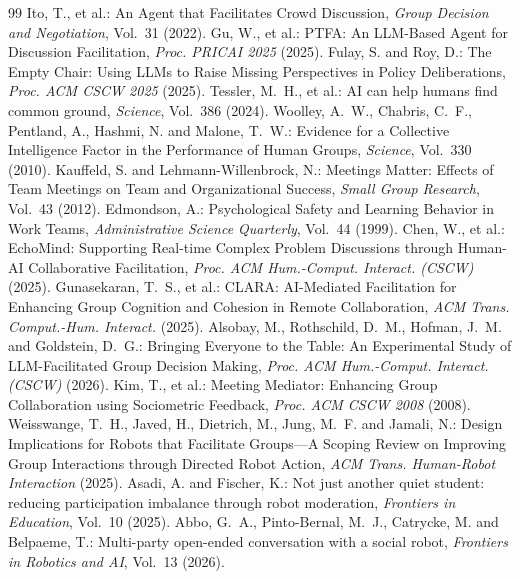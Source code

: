 \documentclass[a4paper]{ltjsarticle}
\begin{document}
\begin{thebibliography}{99}
\fontsize{9}{10.6}\selectfont
{} Ito, T., et al.:
An Agent that Facilitates Crowd Discussion,
\textit{Group Decision and Negotiation}, Vol.~31 (2022).
 Gu, W., et al.:
PTFA: An LLM-Based Agent for Discussion Facilitation,
\textit{Proc. PRICAI 2025} (2025).
 Fulay, S. and Roy, D.:
The Empty Chair: Using LLMs to Raise Missing Perspectives in Policy Deliberations,
\textit{Proc. ACM CSCW 2025} (2025).
 Tessler, M.~H., et al.:
AI can help humans find common ground,
\textit{Science}, Vol.~386 (2024).
 Woolley, A.~W., Chabris, C.~F., Pentland, A., Hashmi, N. and Malone, T.~W.:
Evidence for a Collective Intelligence Factor in the Performance of Human Groups,
\textit{Science}, Vol.~330 (2010).
 Kauffeld, S. and Lehmann-Willenbrock, N.:
Meetings Matter: Effects of Team Meetings on Team and Organizational Success,
\textit{Small Group Research}, Vol.~43 (2012).
 Edmondson, A.:
Psychological Safety and Learning Behavior in Work Teams,
\textit{Administrative Science Quarterly}, Vol.~44 (1999).
 Chen, W., et al.:
EchoMind: Supporting Real-time Complex Problem Discussions through Human-AI Collaborative Facilitation,
\textit{Proc. ACM Hum.-Comput. Interact. (CSCW)} (2025).
 Gunasekaran, T.~S., et al.:
CLARA: AI-Mediated Facilitation for Enhancing Group Cognition and Cohesion in Remote Collaboration,
\textit{ACM Trans. Comput.-Hum. Interact.} (2025).
 Alsobay, M., Rothschild, D.~M., Hofman, J.~M. and Goldstein, D.~G.:
Bringing Everyone to the Table: An Experimental Study of LLM-Facilitated Group Decision Making,
\textit{Proc. ACM Hum.-Comput. Interact. (CSCW)} (2026).
 Kim, T., et al.:
Meeting Mediator: Enhancing Group Collaboration using Sociometric Feedback,
\textit{Proc. ACM CSCW 2008} (2008).
 Weisswange, T.~H., Javed, H., Dietrich, M., Jung, M.~F. and Jamali, N.:
Design Implications for Robots that Facilitate Groups---A Scoping Review on Improving Group Interactions through Directed Robot Action,
\textit{ACM Trans. Human-Robot Interaction} (2025).
 Asadi, A. and Fischer, K.:
Not just another quiet student: reducing participation imbalance through robot moderation,
\textit{Frontiers in Education}, Vol.~10 (2025).
 Abbo, G.~A., Pinto-Bernal, M.~J., Catrycke, M. and Belpaeme, T.:
Multi-party open-ended conversation with a social robot,
\textit{Frontiers in Robotics and AI}, Vol.~13 (2026).

\end{thebibliography}
\end{document}
